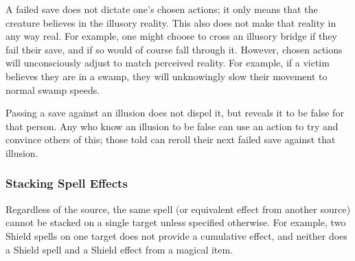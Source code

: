 \documentclass{book}
\begin{document}
A failed save does not dictate one's chosen actions; it only means that
the creature believes in the illusory reality. This also does not make
that reality in any way real. For example, one might choose to cross an
illusory bridge if they fail their save, and if so would of course fall
through it. However, chosen actions will unconsciously adjust to match
perceived reality. For example, if a victim believes they are in a
swamp, they will unknowingly slow their movement to normal swamp speeds.

Passing a save against an illusion does not dispel it, but reveals it to
be false for that person. Any who know an illusion to be false can use
an action to try and convince others of this; those told can reroll
their next failed save against that illusion.

\subsubsection*{Stacking Spell Effects}\label{stacking-spell-effects}

Regardless of the source, the same spell (or equivalent effect from
another source) cannot be stacked on a single target unless specified
otherwise. For example, two Shield spells on one target does not provide
a cumulative effect, and neither does a Shield spell and a Shield effect
from a magical item.
\end{document}
